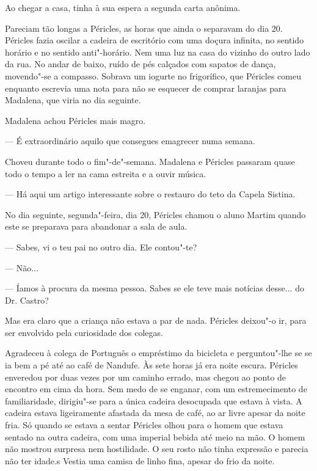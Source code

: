 Ao chegar a casa, tinha à sua espera a segunda carta anônima.

\begin{quotation}
\end{quotation}

Pareciam tão longas a Péricles, as horas que ainda o separavam do dia
20. Péricles fazia oscilar a cadeira de escritório com uma doçura
infinita, no sentido horário e no sentido anti"-horário. Nem uma luz na casa do vizinho do outro lado da rua. No andar
de baixo, ruído de pés calçados com sapatos de dança, movendo"-se a
compasso. Sobrava um iogurte no frigorífico, que Péricles comeu
enquanto escrevia uma nota para não se esquecer de comprar laranjas para
Madalena, que viria no dia seguinte.

Madalena achou Péricles mais magro.

--- É extraordinário aquilo que consegues emagrecer numa semana.


Choveu durante todo o fim"-de"-semana. Madalena e Péricles passaram quase
todo o tempo a ler na cama estreita e a ouvir música.

--- Há aqui um artigo interessante sobre o restauro do teto da Capela Sistina.


No dia seguinte, segunda"-feira, dia 20, Péricles chamou o aluno Martim
quando este se preparava para abandonar a sala de aula.

--- Sabes, vi o teu pai no outro dia. Ele contou"-te?

--- Não...

--- Íamos à procura da mesma pessoa. Sabes se ele teve mais notícias
desse... do Dr. Castro?

Mas era claro que a criança não estava a par de nada. Péricles deixou"-o
ir, para ser envolvido pela curiosidade dos colegas.

Agradeceu à colega de Português o empréstimo da bicicleta e
perguntou"-lhe se se ia bem a pé até ao café de Nandufe. Às sete horas já
era noite escura. Péricles enveredou por duas vezes por um caminho
errado, mas chegou ao ponto de encontro em cima da hora. Sem medo de se
enganar, com um estremecimento de familiaridade, dirigiu"-se para a única
cadeira desocupada que estava à vista. A cadeira estava ligeiramente
afastada da mesa de café, ao ar livre apesar da noite fria. Só quando se
estava a sentar Péricles olhou para o homem que estava sentado na outra
cadeira, com uma imperial bebida até meio na mão. O homem não mostrou
surpresa nem hostilidade. O seu rosto não tinha expressão e parecia
não ter idade.s
Vestia uma camisa de linho fina, apesar do frio da noite.

